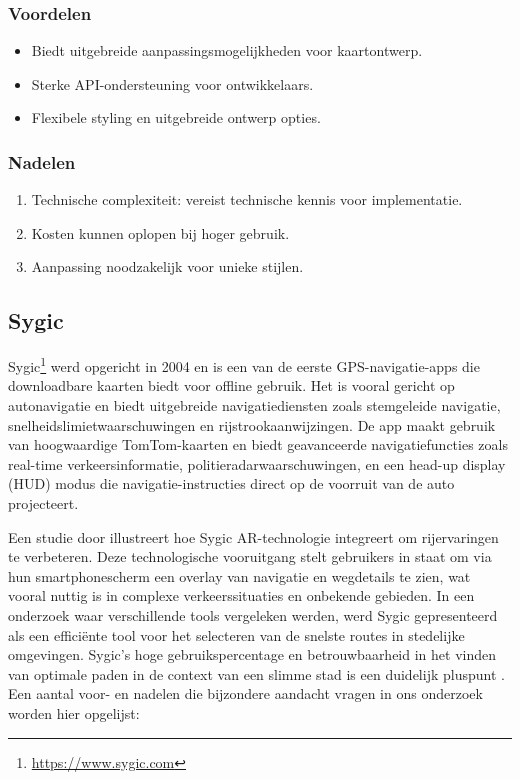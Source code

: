 \subsubsection*{Voordelen}
\begin{itemize}
    \item Biedt uitgebreide aanpassingsmogelijkheden voor kaartontwerp.
    \item Sterke API-ondersteuning voor ontwikkelaars.
    \item Flexibele styling en uitgebreide ontwerp opties.
\end{itemize}
\subsubsection*{Nadelen}
\begin{enumerate}
    \item Technische complexiteit: vereist technische kennis voor implementatie.
    \item Kosten kunnen oplopen bij hoger gebruik.
    \item Aanpassing noodzakelijk voor unieke stijlen.
\end{enumerate}

\subsection{Sygic}
Sygic\footnote{\url{https://www.sygic.com}} werd opgericht in 2004 en is een van de eerste GPS-navigatie-apps die downloadbare kaarten biedt voor offline gebruik. Het is vooral gericht op autonavigatie en biedt uitgebreide navigatiediensten zoals stemgeleide navigatie, snelheidslimietwaarschuwingen en rijstrookaanwijzingen. De app maakt gebruik van hoogwaardige TomTom-kaarten en biedt geavanceerde navigatiefuncties zoals real-time verkeersinformatie, politieradarwaarschuwingen, en een head-up display (HUD) modus die navigatie-instructies direct op de voorruit van de auto projecteert. 

Een studie door \textcite{Wnorowski2018} illustreert hoe Sygic AR-technologie integreert om rijervaringen te verbeteren. Deze technologische vooruitgang stelt gebruikers in staat om via hun smartphonescherm een overlay van navigatie en wegdetails te zien, wat vooral nuttig is in complexe verkeerssituaties en onbekende gebieden. In een onderzoek waar verschillende tools vergeleken werden, werd Sygic gepresenteerd als een efficiënte tool voor het selecteren van de snelste routes in stedelijke omgevingen. Sygic's hoge gebruikspercentage en betrouwbaarheid in het vinden van optimale paden in de context van een slimme stad is een duidelijk pluspunt \autocite{Putra2021}. Een aantal voor- en nadelen die bijzondere aandacht vragen in ons onderzoek worden hier opgelijst:

